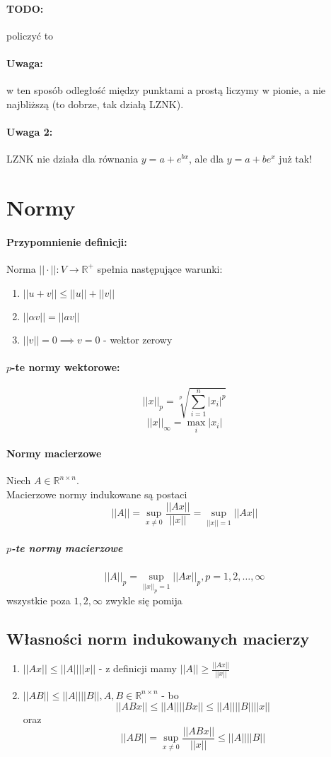 \documentclass{article}
\begin{document}
\paragraph{TODO:} policzyć to
\paragraph{Uwaga:} w ten sposób odległość między punktami a prostą liczymy w pionie, a nie najbliższą (to dobrze, tak działą LZNK).
\paragraph{Uwaga 2:} LZNK nie działa dla równania $ y=a+e^{bx} $, ale dla $ y=a+be^x $ już tak!
\section{Normy}
\paragraph{Przypomnienie definicji: } Norma $ ||\cdot||: V\rightarrow\mathbb{R}^+$ spełnia następujące warunki:
\begin{enumerate}
	\item $||u+v||\leq||u||+||v||$
	\item $||\alpha v||=||av||$
	\item $||v||=0\implies v=0$ - wektor zerowy
\end{enumerate}
\paragraph{$p$-te normy wektorowe:}
$$||x||_p = \sqrt[p]{\sum_{i=1}^{n}|x_i|^p}$$
$$||x||_\infty = \max_i |x_i|$$
\paragraph{Normy macierzowe}
Niech $A\in \mathbb{R}^{n\times n}$.\\
Macierzowe normy indukowane są postaci
$$||A||=\sup_{x\not=0}\frac{||Ax||}{||x||}=\sup_{||x||=1}||Ax||$$
\subparagraph{$p$-te normy macierzowe}
$$||A||_p=\sup_{||x||_p=1}||Ax||_p, p=1, 2, \ldots, \infty$$
wszystkie poza $1, 2, \infty$ zwykle się pomija
\subsection{Własności norm indukowanych macierzy}
\begin{enumerate}
	\item $||Ax||\leq||A||||x||$ - z definicji mamy $ ||A||\geq\frac{||Ax||}{||x||} $
	\item $ ||AB||\leq||A||||B||, A,B\in \mathbb{R}^{n\times n} $ - bo
	$$ ||ABx||\leq||A||||Bx||\leq||A||||B||||x|| $$ oraz
	$$ ||AB||=\sup_{x\not=0}\frac{||ABx||}{||x||}\leq||A||||B|| $$
\end{enumerate}
\end{document}
